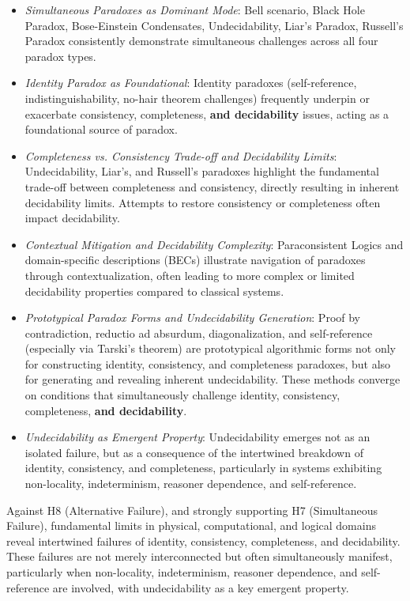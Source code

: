 	\begin{itemize}
		\item \textit{Simultaneous Paradoxes as Dominant Mode}: Bell scenario, Black Hole Paradox, Bose-Einstein Condensates, Undecidability, Liar's Paradox, Russell's Paradox consistently demonstrate simultaneous challenges across all four paradox types.
		\item \textit{Identity Paradox as Foundational}: Identity paradoxes (self-reference, indistinguishability, no-hair theorem challenges) frequently underpin or exacerbate consistency, completeness, \textbf{and decidability} issues, acting as a foundational source of paradox.
		\item \textit{Completeness vs. Consistency Trade-off and Decidability Limits}: Undecidability, Liar's, and Russell's paradoxes highlight the fundamental trade-off between completeness and consistency, directly resulting in inherent decidability limits.  Attempts to restore consistency or completeness often impact decidability.
		\item \textit{Contextual Mitigation and Decidability Complexity}: Paraconsistent Logics and domain-specific descriptions (BECs) illustrate navigation of paradoxes through contextualization, often leading to more complex or limited decidability properties compared to classical systems.
		\item \textit{Prototypical Paradox Forms and Undecidability Generation}: Proof by contradiction, reductio ad absurdum, diagonalization, and self-reference (especially via Tarski's theorem) are prototypical algorithmic forms not only for constructing identity, consistency, and completeness paradoxes, but also for generating and revealing inherent undecidability. These methods converge on conditions that simultaneously challenge identity, consistency, completeness, \textbf{and decidability}.
		\item \textit{Undecidability as Emergent Property}: Undecidability emerges not as an isolated failure, but as a consequence of the intertwined breakdown of identity, consistency, and completeness, particularly in systems exhibiting non-locality, indeterminism, reasoner dependence, and self-reference.
	\end{itemize}
	
	Against H8 (Alternative Failure), and strongly supporting H7 (Simultaneous Failure), fundamental limits in physical, computational, and logical domains reveal intertwined failures of identity, consistency, completeness, and decidability. These failures are not merely interconnected but often simultaneously manifest, particularly when non-locality, indeterminism, reasoner dependence, and self-reference are involved, with undecidability as a key emergent property.
	
